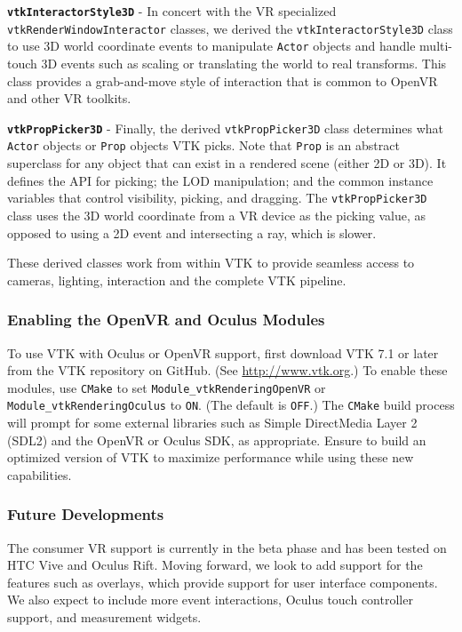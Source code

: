 \textbf{\texttt{vtkInteractorStyle3D}} - In concert with the VR specialized \texttt{vtkRenderWindowInteractor} classes, we derived the \texttt{vtkInteractorStyle3D} class
to use 3D world coordinate events to manipulate \texttt{Actor} objects and handle multi-touch 3D events such as scaling or translating the world to real transforms.
This class provides a grab-and-move style of interaction that is common to OpenVR and other VR toolkits.

\textbf{\texttt{vtkPropPicker3D}} - Finally, the derived \texttt{vtkPropPicker3D} class determines what \texttt{Actor} objects or \texttt{Prop} objects VTK picks.
Note that \texttt{Prop} is an abstract superclass for any object that can exist in a rendered scene (either 2D or 3D). It defines the API for picking; the LOD manipulation; and the common instance variables that control visibility, picking, and dragging.
The \texttt{vtkPropPicker3D} class uses the 3D world coordinate from a VR device as the picking value, as opposed to using a 2D event and intersecting a ray, which is slower.

These derived classes work from within VTK to provide seamless access to cameras, lighting, interaction and the complete VTK pipeline.

\subsubsection{Enabling the OpenVR and Oculus Modules}

To use VTK with Oculus or OpenVR support, first download VTK 7.1 or later from the VTK
repository on GitHub. (See \url{http://www.vtk.org}.)
To enable these modules, use \texttt{CMake} to set \texttt{Module\_vtkRenderingOpenVR} or \texttt{Module\_vtkRenderingOculus} to \texttt{ON}. (The default is \texttt{OFF}.)
The \texttt{CMake} build process will prompt for some external libraries such as Simple DirectMedia Layer 2 (SDL2) and the OpenVR or Oculus SDK, as appropriate.
Ensure to build an optimized version of VTK to maximize performance while using these new capabilities.

\subsubsection{Future Developments}

The consumer VR support is currently in the beta phase and has been tested on HTC Vive and Oculus Rift. Moving forward, we look to add support for the features such as overlays, which provide support for user interface components. We also expect to include more event interactions, Oculus touch controller support, and measurement widgets.


